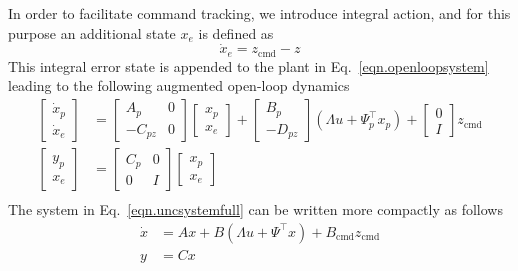 \documentclass[]{../sty/JGCD}
\theoremstyle{examplestyle}
\begin{document}
  In order to facilitate command tracking, we introduce integral action, and for this purpose an additional state $x_e$ is defined as
  \begin{equation}
    \label{eqn.xedot}
    \dot{x}_{e}=z_{\text{cmd}}-z
  \end{equation}
  This integral error state is appended to the plant in Eq.\ \eqref{eqn.openloopsystem} leading to the following augmented open-loop dynamics
  \begin{equation}
    \label{eqn.uncsystemfull}
    \begin{split}
      \begin{bmatrix}
        \dot{x}_{p} \\
        \dot{x}_{e}
      \end{bmatrix}
      &=
      \begin{bmatrix}
        A_{p} & 0 \\
        -C_{pz} & 0
      \end{bmatrix}
      \begin{bmatrix}
        x_{p} \\
        x_{e}
      \end{bmatrix}
      +
      \begin{bmatrix}
        B_{p} \\
        -D_{pz}
      \end{bmatrix}(\Lambda u+\Psi_{p}^{\top}x_{p})
      +
      \begin{bmatrix}
        0 \\
        I
      \end{bmatrix}z_{\text{cmd}} \\
      \begin{bmatrix}
        y_{p} \\
        x_{e}
      \end{bmatrix}
      &=
      \begin{bmatrix}
        C_{p} & 0 \\
        0 & I
      \end{bmatrix}
      \begin{bmatrix}
        x_{p} \\
        x_{e}
      \end{bmatrix} \\
    \end{split}
  \end{equation}
  The system in Eq.\ \eqref{eqn.uncsystemfull} can be written more compactly as follows
  \begin{equation}
    \label{eqn.uncsystem}
    \begin{split}
      \dot{x}&=Ax+B(\Lambda u+\Psi^{\top}x)+B_{\text{cmd}}z_{\text{cmd}} \\
      y&=Cx
    \end{split}
  \end{equation}
\end{document}
